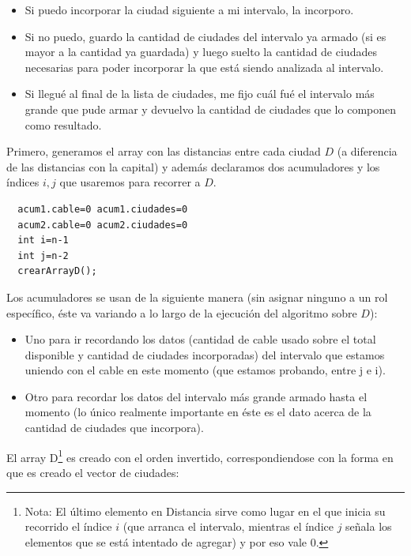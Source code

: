 \documentclass[spanish,a4paper]{article}
\begin{document}
\begin{itemize}

\item Si puedo incorporar la ciudad siguiente a mi intervalo, la incorporo.

\item Si no puedo, guardo la cantidad de ciudades del intervalo ya armado (si es mayor a la cantidad ya guardada) y luego suelto la cantidad de ciudades necesarias para poder incorporar la que está siendo analizada al intervalo.

\item Si llegué al final de la lista de ciudades, me fijo cuál fué el intervalo más grande que pude armar y devuelvo la cantidad de ciudades que lo componen como resultado.
\end{itemize}

\newpage

Primero, generamos el array con las distancias entre cada ciudad $D$ (a diferencia de las distancias con la capital) y además declaramos dos acumuladores y los índices $i, j$ que usaremos para recorrer a $D$.

\begin{lstlisting}
  acum1.cable=0 acum1.ciudades=0
  acum2.cable=0 acum2.ciudades=0          
  int i=n-1
  int j=n-2
  crearArrayD();
\end{lstlisting}

Los acumuladores se usan de la siguiente manera (sin asignar ninguno a un rol específico, éste va variando a lo largo de la ejecución del algoritmo sobre $D$):

\begin{itemize}

\item Uno para ir recordando los datos (cantidad de cable usado sobre el total disponible y cantidad de ciudades incorporadas) del intervalo que estamos uniendo con el cable en este momento (que estamos probando, entre j e i).

\item Otro para recordar los datos del intervalo más grande armado hasta el momento (lo único realmente importante en éste es el dato acerca de la cantidad de ciudades que incorpora).

\end{itemize}

El array D\footnote{Nota: El último elemento en Distancia sirve como lugar en el que inicia su recorrido el índice $i$ (que arranca el intervalo, mientras el índice $j$ señala los elementos que se está intentado de agregar) y por eso vale 0.}
 es creado con el orden invertido, correspondiendose con la forma en que es creado el vector de ciudades:
\end{document}
